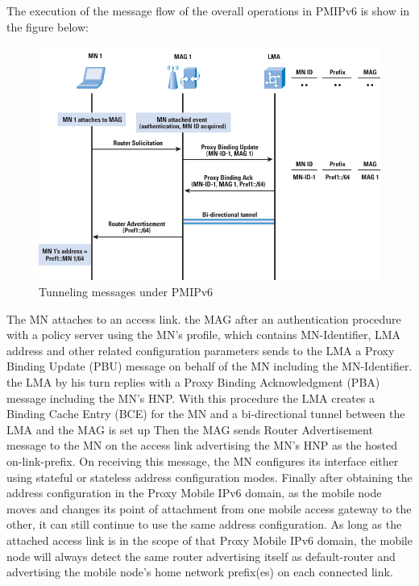 \documentclass{article}
\begin{document}
The execution of the message flow of the overall operations in PMIPv6
is show in the figure below:


\begin{figure}[h!]
  \centering
    \includegraphics[scale=0.5]{reportPictures/figure4.jpg}
  \caption{Tunneling messages under PMIPv6}
\end{figure}

The MN attaches to an access link. the MAG after an authentication
procedure with a policy server using the MN's profile, which contains
MN-Identifier, LMA address and other related configuration parameters
sends to the LMA a Proxy Binding Update (PBU) message on behalf of the
MN including the MN-Identifier. the LMA by his turn replies with a
Proxy Binding Acknowledgment (PBA) message including the MN's
HNP. With this procedure the LMA creates a Binding Cache Entry (BCE)
for the MN and a bi-directional tunnel between the LMA and the MAG is
set up Then the MAG sends Router Advertisement message to the MN on
the access link advertising the MN's HNP as the hosted
on-link-prefix. On receiving this message, the MN configures its
interface either using stateful or stateless address configuration
modes. Finally after obtaining the address configuration in the Proxy
Mobile IPv6 domain, as the mobile node moves and changes its point of
attachment from one mobile access gateway to the other, it can still
continue to use the same address configuration.  As long as the
attached access link is in the scope of that Proxy Mobile IPv6 domain,
the mobile node will always detect the same router advertising itself
as default-router and advertising the mobile node's home network
prefix(es) on each connected link.
\end{document}
